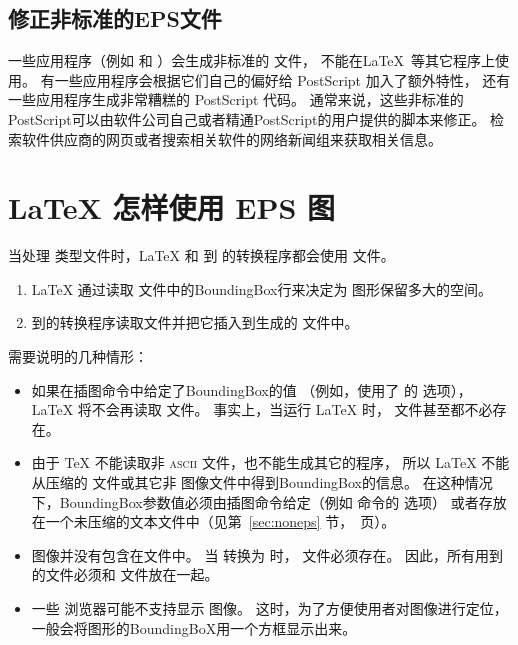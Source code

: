 \subsection{修正非标准的EPS文件}\label{ssec:fixeps}
一些应用程序（例如  和  ）会生成非标准的  文件，
不能在\LaTeX\ 等其它程序上使用。
有一些应用程序会根据它们自己的偏好给 PostScript 加入了额外特性，
还有一些应用程序生成非常糟糕的 PostScript 代码。
通常来说，这些非标准的PostScript可以由软件公司自己或者精通PostScript的用户提供的脚本来修正。
检索软件供应商的网页或者搜索相关软件的网络新闻组来获取相关信息。

\section{\LaTeX{} 怎样使用 EPS 图}\label{sec:useeps}

当处理 类型文件时，\LaTeX{} 和  到  的转换程序都会使用  文件。
\begin{enumerate}
	\item \LaTeX{} 通过读取  文件中的BoundingBox行来决定为  图形保留多大的空间。
	\item {} 到的转换程序读取文件并把它插入到生成的 文件中。
\end{enumerate}

需要说明的几种情形：
\begin{itemize}
	\item 如果在插图命令中给定了BoundingBox的值
	（例如，使用了  的  选项），
	\LaTeX{} 将不会再读取  文件。
	事实上，当运行 \LaTeX{} 时， 文件甚至都不必存在。
	\item 由于 \TeX{} 不能读取非 \textsc{ascii} 文件，也不能生成其它的程序，
	所以 \LaTeX{} 不能从压缩的  文件或其它非  图像文件中得到BoundingBox的信息。
	在这种情况下，BoundingBox参数值必须由插图命令给定（例如  命令的  选项）
	或者存放在一个未压缩的文本文件中（见第~\ref{sec:noneps} 节，\pageref{sec:noneps}~页）。
	\item {} 图像并没有包含在文件中。
	当  转换为  时， 文件必须存在。
	因此，所有用到的文件必须和  文件放在一起。
	\item 一些  浏览器可能不支持显示  图像。
	这时，为了方便使用者对图像进行定位，一般会将图形的BoundingBoX用一个方框显示出来。
\end{itemize}

